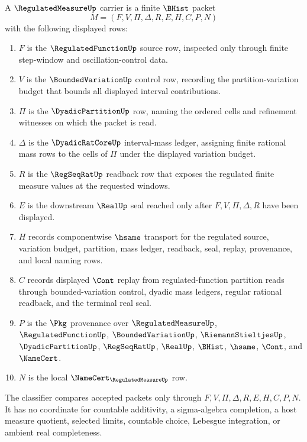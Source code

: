 \begin{definition}
\label{def:regulated-measure-carrier}
A $\RegulatedMeasureUp$ carrier is a finite $\BHist$ packet
$$
M=(F,V,\Pi,\Delta,R,E,H,C,P,N)
$$
with the following displayed rows:
\begin{enumerate}
\item $F$ is the $\RegulatedFunctionUp$ source row, inspected only through finite step-window and oscillation-control data.
\item $V$ is the $\BoundedVariationUp$ control row, recording the partition-variation budget that bounds all displayed interval contributions.
\item $\Pi$ is the $\DyadicPartitionUp$ row, naming the ordered cells and refinement witnesses on which the packet is read.
\item $\Delta$ is the $\DyadicRatCoreUp$ interval-mass ledger, assigning finite rational mass rows to the cells of $\Pi$ under the displayed variation budget.
\item $R$ is the $\RegSeqRatUp$ readback row that exposes the regulated finite measure values at the requested windows.
\item $E$ is the downstream $\RealUp$ seal reached only after $F,V,\Pi,\Delta,R$ have been displayed.
\item $H$ records componentwise $\hsame$ transport for the regulated source, variation budget, partition, mass ledger, readback, seal, replay, provenance, and local naming rows.
\item $C$ records displayed $\Cont$ replay from regulated-function partition reads through bounded-variation control, dyadic mass ledgers, regular rational readback, and the terminal real seal.
\item $P$ is the $\Pkg$ provenance over $\RegulatedMeasureUp$, $\RegulatedFunctionUp$, $\BoundedVariationUp$, $\RiemannStieltjesUp$, $\DyadicPartitionUp$, $\RegSeqRatUp$, $\RealUp$, $\BHist$, $\hsame$, $\Cont$, and $\NameCert$.
\item $N$ is the local $\NameCert_{\RegulatedMeasureUp}$ row.
\end{enumerate}
The classifier compares accepted packets only through $F,V,\Pi,\Delta,R,E,H,C,P,N$. It has no coordinate for countable additivity, a sigma-algebra completion, a host measure quotient, selected limits, countable choice, Lebesgue integration, or ambient real completeness.
\end{definition}

